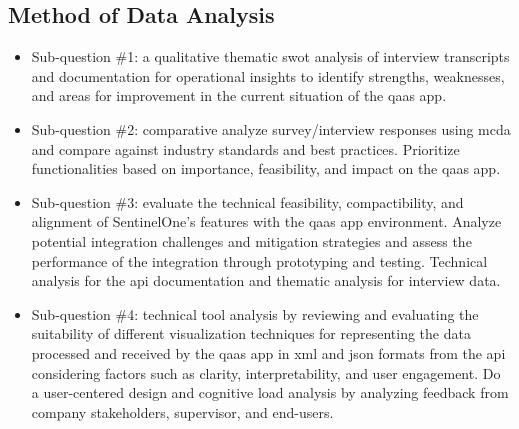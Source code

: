 \begin{multicols}{2}
      \subsection{Method of Data Analysis}
      \begin{itemize}[label=-]
            \item Sub-question \#1: a qualitative thematic \acrshort{swot} analysis of interview transcripts
                  and documentation for operational insights to identify strengths, weaknesses, and areas for
                  improvement in the current situation of the \acrshort{qaas} app.
            \item Sub-question \#2: comparative analyze survey/interview responses using \acrshort{mcda} and
                  compare against industry standards and best practices. Prioritize functionalities based on
                  importance, feasibility, and impact on the \acrshort{qaas} app.
            \item Sub-question \#3: evaluate the technical feasibility, compactibility, and alignment of
                  SentinelOne's features with the \acrshort{qaas} app environment. Analyze potential integration
                  challenges and mitigation strategies and assess the performance of the integration through
                  prototyping and testing. Technical analysis for the \acrshort{api} documentation and
                  thematic analysis for interview data.
            \item Sub-question \#4: technical tool analysis by reviewing and evaluating the suitability of different
                  visualization techniques for representing the data processed and received by the \acrshort{qaas}
                  app in \acrshort{xml} and \acrshort{json} formats from the \acrshort{api} considering factors such
                  as clarity, interpretability, and user engagement. Do a user-centered design and cognitive load
                  analysis by analyzing feedback from company stakeholders, supervisor, and end-users.
      \end{itemize}

\end{multicols}
